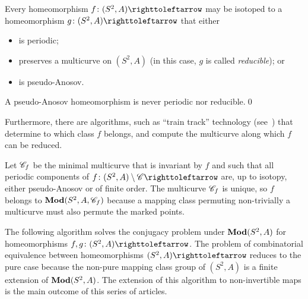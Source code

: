 \documentclass{amsart}
\begin{document}
\begin{thm}\label{thm:nielsen-thurston}
  Every homeomorphism $f\colon(S^2,A)\selfmap$ may be isotoped to a
  homeomorphism $g\colon(S^2,A)\selfmap$ that either
  \begin{itemize}
  \item is periodic;
  \item preserves a multicurve on $(S^2,A)$ (in this case, $g$ is
    called \emph{reducible}); or
  \item is pseudo-Anosov.
  \end{itemize}
  A pseudo-Anosov homeomorphism is never periodic nor reducible.\qed
\end{thm}
Furthermore, there are algorithms, such as ``train track'' technology
(see~\cite{bestvina-h:tt}) that determine to which class $f$ belongs,
and compute the multicurve along which $f$ can be reduced.

Let ${\mathscr C}_f$ be the minimal multicurve that is invariant by $f$ and
such that all periodic components of
$f\colon(S^2,A)\setminus \CC\selfmap$ are, up to isotopy, either
pseudo-Anosov or of finite order. The multicurve ${\mathscr C}_f$ is unique, so
$f$ belongs to $\mathbf{\relax Mod}(S^2,A,{\mathscr C}_f)$ because a mapping class permuting
non-trivially a multicurve must also permute the marked points.

The following algorithm solves the conjugacy problem under
$\mathbf{\relax Mod}(S^2,A)$ for homeomorphisms $f,g\colon(S^2,A)\selfmap$. The
problem of combinatorial equivalence between homeomorphisms
$(S^2,A)\selfmap$ reduces to the pure case because the non-pure mapping class group of $(S^2,A)$ is a finite extension of $\mathbf{\relax Mod}(S^2,A)$. The extension of this algorithm to
non-invertible maps is the main outcome of this series of articles.
\end{document}
